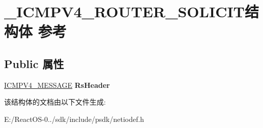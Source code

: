 \hypertarget{struct___i_c_m_p_v4___r_o_u_t_e_r___s_o_l_i_c_i_t}{}\section{\+\_\+\+I\+C\+M\+P\+V4\+\_\+\+R\+O\+U\+T\+E\+R\+\_\+\+S\+O\+L\+I\+C\+I\+T结构体 参考}
\label{struct___i_c_m_p_v4___r_o_u_t_e_r___s_o_l_i_c_i_t}
\subsection*{Public 属性}
\begin{DoxyCompactItemize}
\item 
\mbox{\label{struct___i_c_m_p_v4___r_o_u_t_e_r___s_o_l_i_c_i_t_ae61265591ca667398886c00ec5704646}} 
\hyperlink{struct___i_c_m_p___m_e_s_s_a_g_e}{I\+C\+M\+P\+V4\+\_\+\+M\+E\+S\+S\+A\+GE} {\bfseries Rs\+Header}
\end{DoxyCompactItemize}


该结构体的文档由以下文件生成\+:\begin{DoxyCompactItemize}
\item 
E\+:/\+React\+O\+S-\/0../sdk/include/psdk/netiodef.\+h\end{DoxyCompactItemize}
